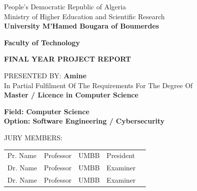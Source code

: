 \documentclass[12pt,a4paper,oneside]{report}
\begin{document}
\thispagestyle{empty}
\begin{center}
    People's Democratic Republic of Algeria\\
    Ministry of Higher Education and Scientific Research\\
    \textbf{University M'Hamed Bougara of Boumerdes}\\
\end{center}

\begin{center}
    \textbf{Faculty of Technology} \\
\end{center}

\begin{center}
    \vfill
    \begin{LARGE}
        \textbf{FINAL YEAR PROJECT REPORT}\\
    \end{LARGE}
    \vfill
    \begin{large} 
        PRESENTED BY: \textbf{Amine}  \\
        In Partial Fulfilment Of The Requirements For The Degree Of \\
        \textbf{Master / Licence in Computer Science}\\
    \end{large}
\end{center}

\vfill
\textbf{Field: Computer Science} \\
\textbf{Option: Software Engineering / Cybersecurity} \\

\begin{center}
\end{center}

\vfill
JURY MEMBERS:\\
\begin{center}
    \begin{tabular}{lllll}
        Pr. Name  & Professor & UMBB  & President\\
        Dr. Name  & Professor & UMBB  & Examiner\\
        Dr. Name  & Professor & UMBB  & Examiner\\
    \end{tabular}
\end{center}
\end{document}
